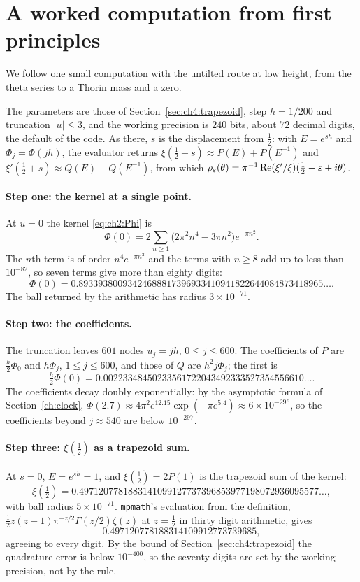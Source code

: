 \section{A worked computation from first principles}\label{ch:worked}

We follow one small computation with the untilted route at low height, from the theta series to a Thorin mass and a zero.

The parameters are those of Section~\ref{sec:ch4:trapezoid}, step $h=1/200$ and truncation $|u|\le3$, and the working precision is $240$ bits, about $72$ decimal digits, the default of the code. As there, $s$ is the displacement from $\frac12$: with $E=e^{sh}$ and $\Phi_j=\Phi(jh)$, the evaluator returns $\xi(\frac12+s)\approx P(E)+P(E^{-1})$ and $\xi'(\frac12+s)\approx Q(E)-Q(E^{-1})$, from which $\rho_\varepsilon(\theta)=\pi^{-1}\operatorname{Re}(\xi'/\xi)(\frac12+\varepsilon+i\theta)$.

\paragraph{Step one: the kernel at a single point.} At $u=0$ the kernel \eqref{eq:ch2:Phi} is
\[
\Phi(0)=2\sum_{n\ge1}\big(2\pi^2n^4-3\pi n^2\big)e^{-\pi n^2}.
\]
The $n$th term is of order $n^4e^{-\pi n^2}$ and the terms with $n\ge8$ add up to less than $10^{-82}$, so seven terms give more than eighty digits:
\[
\Phi(0)=0.89339380093424688817396933410941822644084873418965\ldots.
\]
The ball returned by the arithmetic has radius $3\times10^{-71}$.

\paragraph{Step two: the coefficients.} The truncation leaves $601$ nodes $u_j=jh$, $0\le j\le600$. The coefficients of $P$ are $\frac h2\Phi_0$ and $h\Phi_j$, $1\le j\le600$, and those of $Q$ are $h^2j\Phi_j$; the first is
\[
\tfrac h2\Phi(0)=0.00223348450233561722043492333527354556610\ldots.
\]
The coefficients decay doubly exponentially: by the asymptotic formula of Section~\ref{ch:clock}, $\Phi(2.7)\approx4\pi^2e^{12.15}\exp(-\pi e^{5.4})\approx6\times10^{-296}$, so the coefficients beyond $j\approx540$ are below $10^{-297}$.

\paragraph{Step three: $\xi(\frac12)$ as a trapezoid sum.} At $s=0$, $E=e^{sh}=1$, and $\xi(\frac12)=2P(1)$ is the trapezoid sum of the kernel:
\[
\xi(\tfrac12)=0.4971207781883141099127737396853977198072936095577\ldots,
\]
with ball radius $5\times10^{-71}$. \texttt{mpmath}'s evaluation from the definition, $\frac12z(z-1)\pi^{-z/2}\Gamma(z/2)\zeta(z)$ at $z=\frac12$ in thirty digit arithmetic, gives
\[
0.497120778188314109912773739685,
\]
agreeing to every digit. By the bound of Section~\ref{sec:ch4:trapezoid} the quadrature error is below $10^{-400}$, so the seventy digits are set by the working precision, not by the rule.

